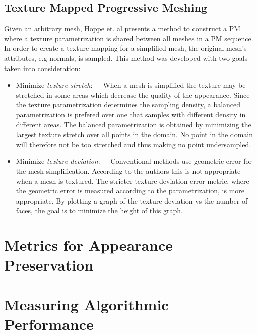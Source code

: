 \subsection{Texture Mapped Progressive Meshing} \label{sec:texture_mapped_progressive_meshing}
Given an arbitrary mesh, Hoppe et. al \cite{hoppe1996progressive} presents a method to construct a PM where a texture parametrization is shared between all meshes in a PM sequence. In order to create a texture mapping for a simplified mesh, the original mesh's attributes, e.g normals, is sampled. This method was developed with two goals taken into consideration:
\begin{itemize}
\item{Minimize \emph{texture stretch}:}~~~When a mesh is simplified the texture may be stretched in some areas which decrease the quality of the appearance. Since the texture parametrization determines the sampling density, a balanced parametrization is prefered over one that samples with different density in different areas. The balanced parametrization is obtained by minimizing the largest texture stretch over all points in the domain. No point in the domain will therefore not be too stretched and thus making no point undersampled. 
\item{Minimize \emph{texture deviation}:}~~~Conventional methods use geometric error for the mesh simplification. According to the authors this is not appropriate when a mesh is textured. The stricter texture deviation error metric, where the geometric error is measured according to the parametrization, is more appropriate. By plotting a graph of the texture deviation vs the number of faces, the goal is to minimize the height of this graph.
\end{itemize}

\section{Metrics for Appearance Preservation} \label{sec:metrics_for_appearance_preservation}

\section{Measuring Algorithmic Performance} \label{sec:measuring_algorithmic_performance}


